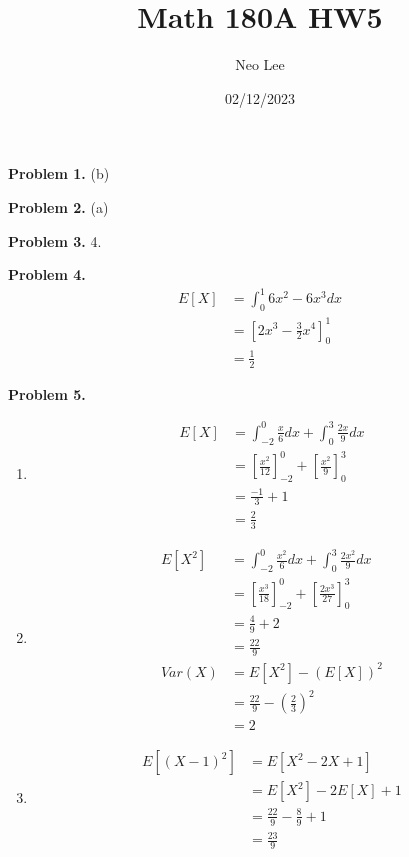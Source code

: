 \documentclass{article}
\title{Math 180A HW5}
\author{Neo Lee}
\date{02/12/2023}
\begin{document}
 

\maketitle 

\textbf{Problem 1.} (b)
\bigbreak

\textbf{Problem 2.} (a)
\bigbreak

\textbf{Problem 3.} 4.
\bigbreak

\textbf{Problem 4.} 
\begin{align}
    E[X] & = \int_{0}^{1}6x^2-6x^3dx \\
    & = \left[2x^3 - \frac{3}{2}x^4\right]_0^1 \\ 
    & = \frac{1}{2}
\end{align}
\bigbreak

\textbf{Problem 5.}
\begin{enumerate}[label={(\alph*)}]
    \item 
    \begin{align}
        E[X] & = \int_{-2}^{0}\frac{x}{6}dx + \int_{0}^{3} \frac{2x}{9}dx \\
        & = \left[\frac{x^2}{12}\right]_{-2}^0 + \left[\frac{x^2}{9}\right]_0^3 \\
        & = \frac{-1}{3} + 1 \\
        & = \frac{2}{3}
    \end{align}

    \item 
    \begin{align}
        E[X^2] & = \int_{-2}^{0}\frac{x^2}{6}dx + \int_{0}^{3}\frac{2x^2}{9}dx \\
        & = \left[\frac{x^3}{18}\right]_{-2}^0 + \left[\frac{2x^3}{27}\right]_0^3 \\
        & = \frac{4}{9} + 2 \\
        & = \frac{22}{9} \\
        Var(X) & = E[X^2] - (E[X])^2 \\
        & = \frac{22}{9} - \left(\frac{2}{3}\right)^2 \\
        & = 2
    \end{align}

    \item 
    \begin{align}
        E[(X-1)^2] & = E[X^2-2X+1] \\
        & = E[X^2]-2E[X]+1 \\
        & = \frac{22}{9} - \frac{8}{9}+1 \\
        & = \frac{23}{9}
    \end{align}
\end{enumerate}
\bigbreak
\end{document}
